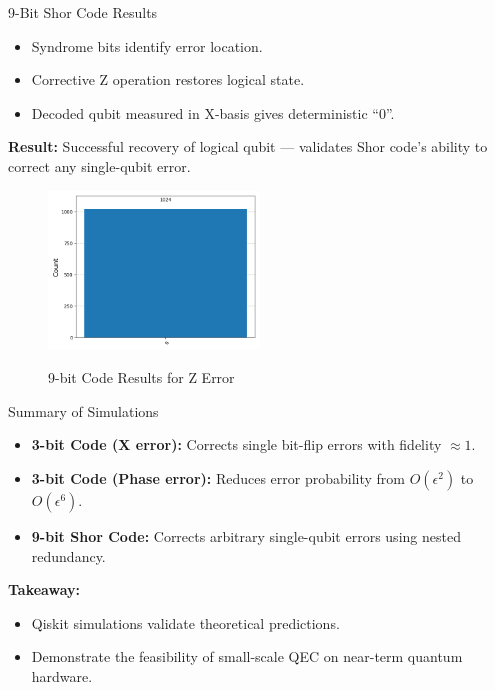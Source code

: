 \documentclass[10pt]{beamer}
\begin{document}
\begin{frame}{9-Bit Shor Code Results}
\begin{itemize}
    \item Syndrome bits identify error location.
    \item Corrective Z operation restores logical state.
    \item Decoded qubit measured in X-basis gives deterministic “0”.
\end{itemize}

\vspace{0.2cm}
\textbf{Result:} Successful recovery of logical qubit — validates Shor code's ability to correct any single-qubit error.

\begin{figure}[h!]
  
  \centering
  \includegraphics[width=0.5\textwidth]{../../Codes/results/9bitCode/FinalHistogram.png} \\[4pt]
  \caption{9-bit Code Results for Z Error}
\end{figure}
\end{frame}

\begin{frame}{Summary of Simulations}
\begin{itemize}
    \item \textbf{3-bit Code (X error):} Corrects single bit-flip errors with fidelity $\approx 1$.
    \item \textbf{3-bit Code (Phase error):} Reduces error probability from $O(\epsilon^2)$ to $O(\epsilon^6)$.
    \item \textbf{9-bit Shor Code:} Corrects arbitrary single-qubit errors using nested redundancy.
\end{itemize}

\vspace{0.3cm}
\textbf{Takeaway:}
\begin{itemize}
    \item Qiskit simulations validate theoretical predictions.
    \item Demonstrate the feasibility of small-scale QEC on near-term quantum hardware.
\end{itemize}
\end{frame}
\end{document}
